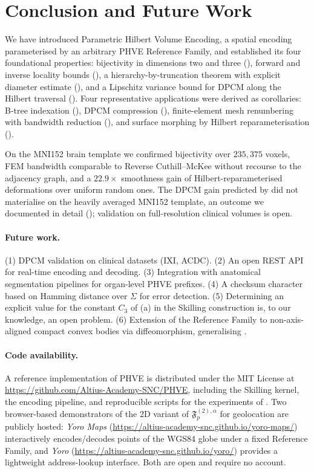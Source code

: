 \documentclass[11pt,a4paper]{article}
\theoremstyle{plain}
\theoremstyle{definition}
\theoremstyle{remark}
\newcommand{\Fc}{\mathfrak{F}}
\begin{document}
\section{Conclusion and Future Work}\label{sec:conclusion}

We have introduced Parametric Hilbert Volume Encoding, a spatial encoding
parameterised by an arbitrary PHVE Reference Family, and established its
four foundational properties: bijectivity in dimensions two and three
(), forward and inverse locality bounds
(), a hierarchy-by-truncation theorem with explicit
diameter estimate (), and a Lipschitz variance
bound for DPCM along the Hilbert traversal (). Four
representative applications were derived as corollaries: B-tree
indexation (), DPCM compression
(), finite-element mesh renumbering with bandwidth
reduction (), and surface morphing by Hilbert
reparameterisation ().

On the MNI152 brain template we confirmed bijectivity over
$235{,}375$ voxels, FEM bandwidth comparable to Reverse Cuthill--McKee
without recourse to the adjacency graph, and a $22.9\times$ smoothness
gain of Hilbert-reparameterised deformations over uniform random ones. The DPCM gain predicted by
 did not materialise on the heavily averaged MNI152
template, an outcome we documented in detail
(); validation on
full-resolution clinical volumes is open.

\paragraph{Future work.} (1) DPCM validation on clinical datasets
(IXI, ACDC). (2) An open REST API for real-time encoding and decoding.
(3) Integration with anatomical segmentation pipelines for organ-level
PHVE prefixes. (4) A checksum character based on Hamming distance over
$\Sigma$ for error detection. (5) Determining an explicit value for
the constant $C_3$ of (a) in the Skilling
construction is, to our knowledge, an open problem. (6) Extension of
the Reference Family to non-axis-aligned compact convex bodies via
diffeomorphism, generalising .

\paragraph{Code availability.} A reference implementation of PHVE is
distributed under the MIT License at
\url{https://github.com/Altius-Academy-SNC/PHVE}, including the
Skilling kernel, the encoding pipeline, and reproducible scripts for
the experiments of . Two browser-based
demonstrators of the 2D variant of $\Fc_p^{(2),\alpha}$ for
geolocation are publicly hosted: \emph{Yoro Maps}
(\url{https://altius-academy-snc.github.io/yoro-maps/}) interactively
encodes/decodes points of the WGS84 globe under a fixed Reference
Family, and \emph{Yoro} (\url{https://altius-academy-snc.github.io/yoro/})
provides a lightweight address-lookup interface. Both are open and
require no account.
\end{document}
